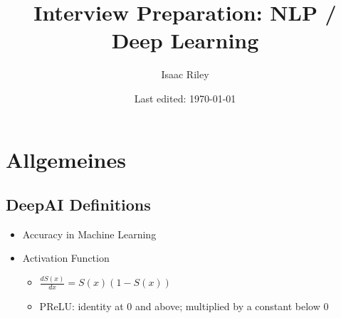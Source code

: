 \documentclass[a4paper]{article}
\title{Interview Preparation: NLP / Deep Learning}
\author{Isaac Riley}
\date{Last edited: \today}
\newcommand{\cmark}{\ding{51}}%
\newcommand{\done}{\rlap{$\square$}{\raisebox{2pt}{\large\hspace{1pt}\cmark}}\hspace{-2.5pt}}
\begin{document}
\maketitle
\tableofcontents
\newpage



\setcounter{section}{-1}
\section{Allgemeines}

\subsection{DeepAI Definitions}
\begin{itemize}
    \item [\done] Accuracy in Machine Learning
    \item [\done] Activation Function \\ 
    \begin{itemize}
        \item $\frac{dS(x)}{dx} = S(x)(1-S(x))$
        \item PReLU: identity at 0 and above; multiplied by a constant below 0
    \end{itemize}
    

\end{itemize}
\end{document}
